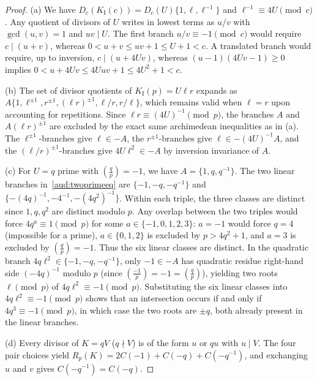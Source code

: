 \documentclass[11pt, a4paper]{article}
\theoremstyle{plain}
\theoremstyle{definition}
\newcommand{\leg}[2]{\left(\frac{#1}{#2}\right)}
\newcommand{\I}{\mathrm{I}}
\begin{document}
\begin{proof}
(a) We have $D_c(K_{\I}(c))=D_c(U)\{1,\ell,\ell^{-1}\}$ and $\ell^{-1}\equiv 4U\pmod c$. Any quotient of divisors of $U$ writes in lowest terms as $u/v$ with $\gcd(u,v)=1$ and $uv\mid U$. The first branch $u/v\equiv -1\pmod c$ would require $c\mid(u+v)$, whereas $0<u+v\le uv+1\le U+1<c$. A translated branch would require, up to inversion, $c\mid(u+4Uv)$, whereas $(u-1)(4Uv-1)\ge 0$ implies $0<u+4Uv\le 4Uuv+1\le 4U^{2}+1<c$.

(b) The set of divisor quotients of $K_{\I}(p)=U\ell r$ expands as $A\big\{1,\ell^{\pm1},r^{\pm1},(\ell r)^{\pm1},\ell/r,r/\ell\big\}$, which remains valid when $\ell=r$ upon accounting for repetitions. Since $\ell r\equiv(4U)^{-1}\pmod p$, the branches $A$ and $A(\ell r)^{\pm1}$ are excluded by the exact same archimedean inequalities as in (a). The $\ell^{\pm1}$-branches give $\ell\in -A$, the $r^{\pm1}$-branches give $\ell\in -(4U)^{-1}A$, and the $(\ell/r)^{\pm1}$-branches give $4U\ell^{2}\in -A$ by inversion invariance of $A$.

(c) For $U=q$ prime with $\leg{q}{p}=-1$, we have $A=\{1,q,q^{-1}\}$. The two linear branches in~\eqref{aud:twoprimeeq} are $\{-1,-q,-q^{-1}\}$ and $\{-(4q)^{-1},-4^{-1},-(4q^{2})^{-1}\}$. Within each triple, the three classes are distinct since $1,q,q^{2}$ are distinct modulo $p$. Any overlap between the two triples would force $4q^{a}\equiv 1\pmod p$ for some $a\in\{-1,0,1,2,3\}$: $a=-1$ would force $q=4$ (impossible for a prime), $a\in\{0,1,2\}$ is excluded by $p>4q^{2}+1$, and $a=3$ is excluded by $\leg{q}{p}=-1$. Thus the six linear classes are distinct. In the quadratic branch $4q\ell^{2}\in\{-1,-q,-q^{-1}\}$, only $-1\in -A$ has quadratic residue right-hand side $(-4q)^{-1}$ modulo $p$ (since $\leg{-1}{p}=-1=\leg{q}{p}$), yielding two roots $\ell\pmod p$ of $4q\ell^{2}\equiv -1\pmod p$. Substituting the six linear classes into $4q\ell^{2}\equiv -1\pmod p$ shows that an intersection occurs if and only if $4q^{3}\equiv -1\pmod p$, in which case the two roots are $\pm q$, both already present in the linear branches.

(d) Every divisor of $K=qV$ ($q\nmid V$) is of the form $u$ or $qu$ with $u\mid V$. The four pair choices yield $R_p(K)=2C(-1)+C(-q)+C(-q^{-1})$, and exchanging $u$ and $v$ gives $C(-q^{-1})=C(-q)$.
\end{proof}
\end{document}
